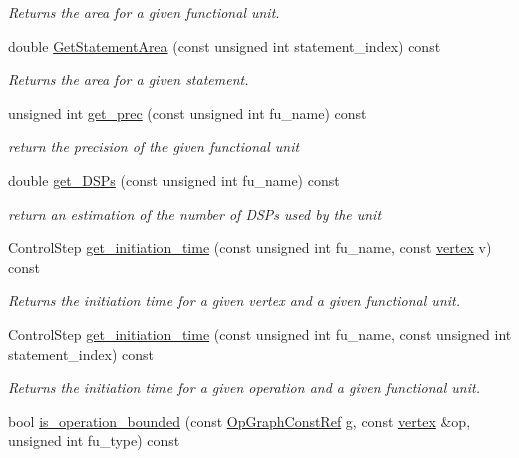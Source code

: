 \begin{DoxyCompactItemize}
\begin{DoxyCompactList}\small\item\em Returns the area for a given functional unit. \end{DoxyCompactList}\item 
double \hyperlink{classAllocationInformation_a6b0a7b42d192682285f640c8499e142d}{Get\+Statement\+Area} (const unsigned int statement\+\_\+index) const
\begin{DoxyCompactList}\small\item\em Returns the area for a given statement. \end{DoxyCompactList}\item 
unsigned int \hyperlink{classAllocationInformation_ac2e117b073287246d06915ef5d089ae5}{get\+\_\+prec} (const unsigned int fu\+\_\+name) const
\begin{DoxyCompactList}\small\item\em return the precision of the given functional unit \end{DoxyCompactList}\item 
double \hyperlink{classAllocationInformation_a82d30f63d76245714b5a3b6a805d8aaf}{get\+\_\+\+D\+S\+Ps} (const unsigned int fu\+\_\+name) const
\begin{DoxyCompactList}\small\item\em return an estimation of the number of D\+S\+Ps used by the unit \end{DoxyCompactList}\item 
Control\+Step \hyperlink{classAllocationInformation_a4e2b7808fff53d834b80063761b3d802}{get\+\_\+initiation\+\_\+time} (const unsigned int fu\+\_\+name, const \hyperlink{graph_8hpp_abefdcf0544e601805af44eca032cca14}{vertex} v) const
\begin{DoxyCompactList}\small\item\em Returns the initiation time for a given vertex and a given functional unit. \end{DoxyCompactList}\item 
Control\+Step \hyperlink{classAllocationInformation_acb8b91c250bba52b3f9ece7e9ff20a6e}{get\+\_\+initiation\+\_\+time} (const unsigned int fu\+\_\+name, const unsigned int statement\+\_\+index) const
\begin{DoxyCompactList}\small\item\em Returns the initiation time for a given operation and a given functional unit. \end{DoxyCompactList}\item 
bool \hyperlink{classAllocationInformation_aad2976199807a359f2d1b79c6d4481e4}{is\+\_\+operation\+\_\+bounded} (const \hyperlink{op__graph_8hpp_a9a0b240622c47584bee6951a6f5de746}{Op\+Graph\+Const\+Ref} g, const \hyperlink{graph_8hpp_abefdcf0544e601805af44eca032cca14}{vertex} \&op, unsigned int fu\+\_\+type) const

\end{DoxyCompactItemize}
